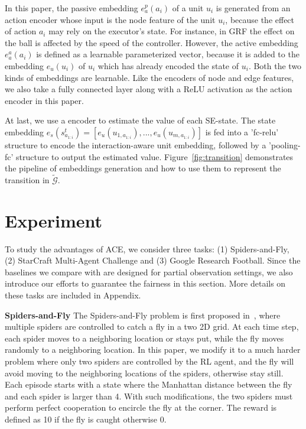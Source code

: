 \documentclass[letterpaper]{article} \usepackage{aaai23}  \usepackage{times}  \usepackage{helvet}  \usepackage{courier}  \usepackage[hyphens]{url}  \usepackage{graphicx} \urlstyle{rm} \def\UrlFont{\rm}  \usepackage{natbib}  \usepackage{caption} \frenchspacing  \setlength{\pdfpagewidth}{8.5in} \setlength{\pdfpageheight}{11in} \usepackage{algorithm}
\begin{document}
In this paper, the passive embedding $e_a^p\left(a_i\right)$ of a unit $u_i$ is generated from an action encoder whose input is the node feature of the unit $u_i$, because the effect of action $a_i$ may rely on the executor's state. For instance, in GRF the effect on the ball is affected by the speed of the controller. However, the active embedding $e_a^a\left(a_i\right)$ is defined as a learnable parameterized vector, because it is added to the embedding $e_u\left(u_i\right)$ of $u_i$ which has already encoded the state of $u_i$. Both the two kinds of embeddings are learnable. Like the encoders of node and edge features, we also take a fully connected layer along with a ReLU activation as the action encoder in this paper. 

At last, we use a encoder to estimate the value of each SE-state. 
The state embedding $e_s\left(s_{a_{1:i}}^t\right)=\left[e_u\left(u_{1,a_{1:i}}\right),...,e_u\left(u_{m,a_{1:i}}\right)\right]$ is fed into a 'fc-relu' structure to encode the interaction-aware unit embedding, 
followed by a 'pooling-fc' structure to output the estimated value. 
Figure~\ref{fig:transition} demonstrates the pipeline of embeddings generation and how to use them to represent the transition in $\widetilde{\mathcal{G}}$.

 \section{Experiment}

To study the advantages of ACE, we consider three tasks: (1) Spiders-and-Fly, (2) StarCraft Multi-Agent Challenge and (3) Google Research Football. Since the baselines we compare with are designed for partial observation settings, we also introduce our efforts to guarantee the fairness in this section. More details on these tasks are included in Appendix.

\textbf{Spiders-and-Fly} The Spiders-and-Fly problem is first proposed in~\citeyear{multiagent_rollout}, where multiple spiders are controlled to catch a fly in a two 2D grid. At each time step, each spider moves to a neighboring location or stays put, while the fly moves randomly to a neighboring location. In this paper, we modify it to a much harder problem where only two spiders are controlled by the RL agent, and the fly will avoid moving to the neighboring locations of the spiders, otherwise stay still. Each episode starts with a state where the Manhattan distance between the fly and each spider is larger than 4. With such modifications, the two spiders must perform perfect cooperation to encircle the fly at the corner. The reward is defined as 10 if the fly is caught otherwise 0. 
\end{document}
